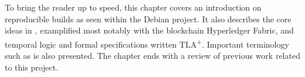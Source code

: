 \documentclass[english, biblatex, digitaloutput]{kththesis}
\begin{document}

To bring the reader up to speed, this chapter covers an introduction on reproducible builds as seen within the Debian project. It also describes the core ideas in , examplified most notably with the blockchain Hyperledger Fabric, and temporal logic and formal specifications written TLA\textsuperscript+. Important terminology such as  is also presented. The chapter ends with a review of previous work related to this project.





\end{document}
